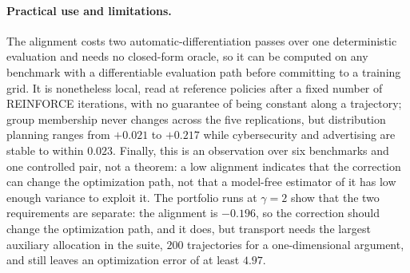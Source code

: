 \paragraph{Practical use and limitations.}
The alignment costs two automatic-differentiation passes over one deterministic evaluation and needs no closed-form oracle, so it can be computed on any benchmark with a differentiable evaluation path before committing to a training grid. It is nonetheless local, read at reference policies after a fixed number of REINFORCE iterations, with no guarantee of being constant along a trajectory; group membership never changes across the five replications, but distribution planning ranges from $+0.021$ to $+0.217$ while cybersecurity and advertising are stable to within $0.023$. Finally, this is an observation over six benchmarks and one controlled pair, not a theorem: a low alignment indicates that the correction can change the optimization path, not that a model-free estimator of it has low enough variance to exploit it. The portfolio runs at $\gamma=2$ show that the two requirements are separate: the alignment is $-0.196$, so the correction should change the optimization path, and it does, but transport needs the largest auxiliary allocation in the suite, $200$ trajectories for a one-dimensional argument, and still leaves an optimization error of at least $4.97$.
